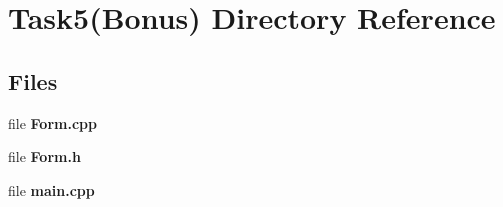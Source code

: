 \section{Task5(Bonus) Directory Reference}
\label{dir_c5ff6f10107677700cc3f0a6506ae9f7}
\subsection*{Files}
\begin{DoxyCompactItemize}
\item 
file {\bfseries Form.\+cpp}
\item 
file {\bfseries Form.\+h}
\item 
file {\bfseries main.\+cpp}
\end{DoxyCompactItemize}
